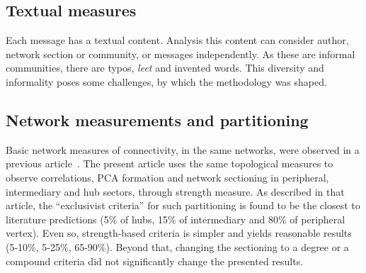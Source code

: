 \documentclass[%
 aip,
 jmp,%
 amsmath,amssymb,
 reprint,%
]{revtex4-1}
\begin{document}
%

\subsection{Textual measures}
Each message has a textual content. 
Analysis this content can consider author, network section or community, or messages independently.
As these are informal communities, there are typos, \emph{leet} and invented words.
This diversity and informality poses some challenges, by which the methodology was shaped.



\subsection{Network measurements and partitioning}
Basic network measures of connectivity, in the same networks, were observed in a previous article~\cite{evoSN}.
The present article uses the same topological measures to observe correlations, PCA formation and network sectioning in peripheral, intermediary and hub sectors,
through strength measure. As described in that article, the ``exclusivist criteria'' for such partitioning is found to be the closest to literature
predictions (5\% of hubs, 15\% of intermediary and 80\% of peripheral vertex). Even so, strength-based
criteria is simpler and yields reasonable results (5-10\%, 5-25\%, 65-90\%).
Beyond that, changing the sectioning to a degree or a compound criteria did not significantly change the presented results.
\end{document}
